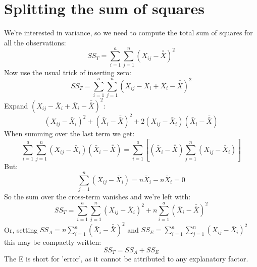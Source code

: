 \documentclass[12pt, a4paper]{article}
\newcommand*{\doublebar}[1]{\bar{\bar{#1}}}
\begin{document}
\section{Splitting the sum of squares}
We're interested in variance, so we need to compute the total sum of squares for all the observations:
\begin{equation}
SS_T=\sum_{i=1}^a\sum_{j=1}^n\left(X_{ij}-\doublebar{X}\right)^2
\end{equation}
Now use the usual trick of inserting zero:
\begin{equation}
SS_T=\sum_{i=1}^a\sum_{j=1}^n\left(X_{ij}-\bar{X}_i+\bar{X}_i-\doublebar{X}\right)^2
\end{equation}
Expand $\left(X_{ij}-\bar{X}_i+\bar{X}_i-\doublebar{X}\right)^2$:
\begin{equation}
\left(X_{ij}-\bar{X}_i\right)^2+\left(\bar{X}_i-\doublebar{X}\right)^2+2\left(X_{ij}-\bar{X}_i\right)\left(\bar{X}_i-\doublebar{X}\right)
\end{equation}
When summing over the last term we get:
\begin{equation}
\sum_{i=1}^a\sum_{j=1}^n\left(X_{ij}-\bar{X}_i\right)\left(\bar{X}_i-\doublebar{X}\right)=\sum_{i=1}^a\left[\left(\bar{X}_i-\doublebar{X}\right)\sum_{j=1}^n\left(X_{ij}-\bar{X}_i\right)\right]
\end{equation}
But:
\begin{equation}
\sum_{j=1}^n\left(X_{ij}-\bar{X}_i\right)=n\bar{X}_i-n\bar{X}_i=0
\end{equation}
So the sum over the cross-term vanishes and we're left with:
\begin{equation}
SS_T=\sum_{i=1}^a\sum_{j=1}^n\left(X_{ij}-\bar{X}_i\right)^2+n\sum_{i=1}^a\left(\bar{X}_i-\doublebar{X}\right)^2
\end{equation}
Or, setting $SS_A=n\sum_{i=1}^a\left(\bar{X}_i-\doublebar{X}\right)^2$ and $SS_E=\sum_{i=1}^a\sum_{j=1}^n\left(X_{ij}-\bar{X}_i\right)^2$ this may be compactly written:
\begin{equation}
\label{totalsum}
SS_T=SS_A+SS_E
\end{equation}
The E is short for 'error', as it cannot be attributed to any explanatory factor.
\end{document}
